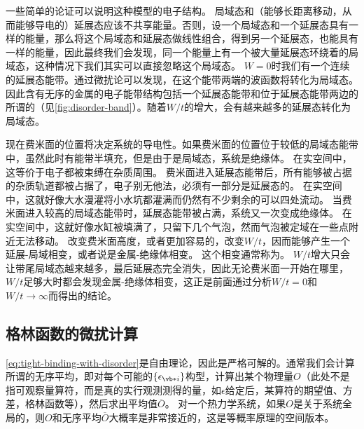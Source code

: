 一些简单的论证可以说明这种模型的电子结构。
局域态和（能够长距离移动，从而能够导电的）延展态应该不共享能量。否则，设一个局域态和一个延展态具有一样的能量，那么将这个局域态和延展态做线性组合，得到另一个延展态，也能具有一样的能量，因此最终我们会发现，同一个能量上有一个被大量延展态环绕着的局域态，这种情况下我们其实可以直接忽略这个局域态。
$W=0$时我们有一个连续的延展态能带。通过微扰论可以发现，在这个能带两端的波函数将转化为局域态。%
因此含有无序的金属的电子能带结构包括一个延展态能带和位于延展态能带两边的所谓的（见\autoref{fig:disorder-band}）。随着$W/t$的增大，会有越来越多的延展态转化为局域态。

现在费米面的位置将决定系统的导电性。如果费米面的位置位于较低的局域态能带中，虽然此时有能带半填充，但是由于是局域态，系统是绝缘体。
在实空间中，这等价于电子都被束缚在杂质周围。
费米面进入延展态能带后，所有能够被占据的杂质轨道都被占据了，电子别无他法，必须有一部分是延展态的。
在实空间中，这就好像大水漫灌将小水坑都灌满而仍然有不少剩余的可以四处流动。
当费米面进入较高的局域态能带时，延展态能带被占满，系统又一次变成绝缘体。
在实空间中，这就好像水缸被填满了，只留下几个气泡，然而气泡被定域在一些点附近无法移动。
改变费米面高度，或者更加容易的，改变$W/t$，因而能够产生一个延展-局域相变，或者说是金属-绝缘体相变。
这个相变通常称为。
$W/t$增大只会让带尾局域态越来越多，最后延展态完全消失，因此无论费米面一开始在哪里，$W/t$足够大时都会发现金属-绝缘体相变，这正是前面通过分析$W/t=0$和$W/t \to \infty$而得出的结论。

\subsection{格林函数的微扰计算}

\eqref{eq:tight-binding-with-disorder}是自由理论，因此是严格可解的。通常我们会计算所谓的无序平均，即对每个可能的$\{\epsilon_{\vb*{i}}\}$构型，计算出某个物理量$O$（此处不是指可观察量算符，而是真的实行观测测得的量，如$\epsilon$给定后，某算符的期望值、方差，格林函数等），然后求出平均值$\overline{O}$。
对一个热力学系统，如果$O$是关于系统全局的，则$O$和无序平均$\overline{O}$大概率是非常接近的，这是等概率原理的空间版本。

